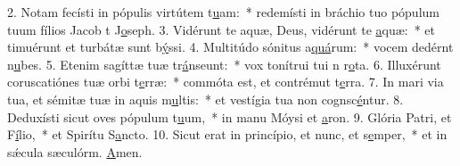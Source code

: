 2. Notam fecísti in pópulis virtútem t\uline{u}am:~* redemísti in bráchio tuo pópulum tuum fílios Jacob t J\uline{o}seph.
3. Vidérunt te aquæ, Deus, vidérunt te \uline{a}quæ:~* et timuérunt et turbátæ sunt b\uline{ý}ssi.
4. Multitúdo sónitus a\uline{quá}rum:~* vocem dedérnt n\uline{u}bes.
5. Etenim sagíttæ tuæ tr\uline{á}nseunt:~* vox tonítrui tui n r\uline{o}ta.
6. Illuxérunt coruscatiónes tuæ orbi t\uline{e}rræ:~* commóta est, et contrémut t\uline{e}rra.
7. In mari via tua, et sémitæ tuæ in aquis m\uline{u}ltis:~* et vestígia tua non cognsc\uline{é}ntur.
8. Deduxísti sicut oves pópulum t\uline{u}um,~* in manu Móysi et \uline{a}ron.
9. Glória Patri, et F\uline{í}lio,~* et Spirítu S\uline{a}ncto.
10. Sicut erat in princípio, et nunc, et s\uline{e}mper,~* et in sǽcula sæculórm. \uline{A}men.

